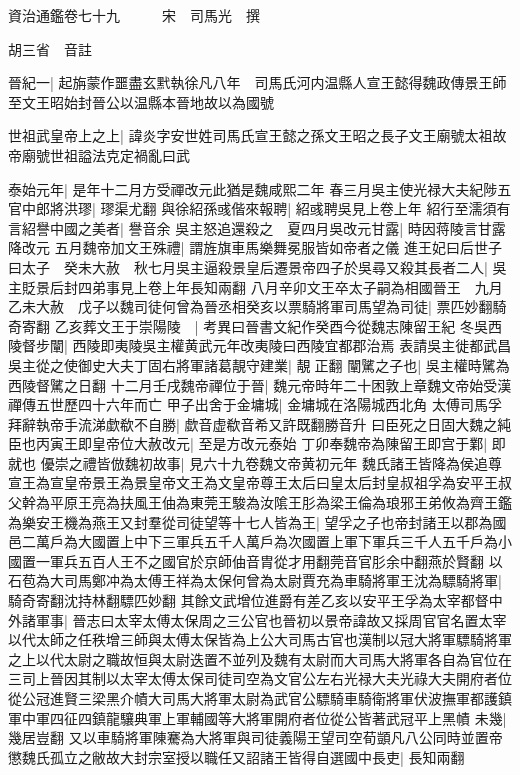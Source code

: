 資治通鑑卷七十九　　　宋　司馬光　撰

胡三省　音註

晉紀一|{
	起旃蒙作噩盡玄黓執徐凡八年　司馬氏河内温縣人宣王懿得魏政傳景王師至文王昭始封晉公以温縣本晉地故以為國號}


世祖武皇帝上之上|{
	諱炎字安世姓司馬氏宣王懿之孫文王昭之長子文王廟號太祖故帝廟號世祖謚法克定禍亂曰武}


泰始元年|{
	是年十二月方受禪改元此猶是魏咸熙二年}
春三月吳主使光禄大夫紀陟五官中郎將洪璆|{
	璆渠尤翻}
與徐紹孫彧偕來報聘|{
	紹彧聘吳見上卷上年}
紹行至濡須有言紹譽中國之美者|{
	譽音余}
吳主怒追還殺之　夏四月吳改元甘露|{
	時因蒋陵言甘露降改元}
五月魏帝加文王殊禮|{
	謂旌旗車馬樂舞冕服皆如帝者之儀}
進王妃曰后世子曰太子　癸未大赦　秋七月吳主逼殺景皇后遷景帝四子於吳尋又殺其長者二人|{
	吳主貶景后封四弟事見上卷上年長知兩翻}
八月辛卯文王卒太子嗣為相國晉王　九月乙未大赦　戊子以魏司徒何曾為晉丞相癸亥以票騎將軍司馬望為司徒|{
	票匹妙翻騎奇寄翻}
乙亥葬文王于崇陽陵　|{
	考異曰晉書文紀作癸酉今從魏志陳留王紀}
冬吳西陵督步闡|{
	西陵即夷陵吳主權黄武元年改夷陵曰西陵宜都郡治焉}
表請吳主徙都武昌吳主從之使御史大夫丁固右將軍諸葛靚守建業|{
	靚正翻}
闡騭之子也|{
	吳主權時騭為西陵督騭之日翻}
十二月壬戌魏帝禪位于晉|{
	魏元帝時年二十困敦上章魏文帝始受漢禪傳五世歷四十六年而亡}
甲子出舍于金墉城|{
	金墉城在洛陽城西北角}
太傅司馬孚拜辭執帝手流涕歔欷不自勝|{
	歔音虚欷音希又許既翻勝音升}
曰臣死之日固大魏之純臣也丙寅王即皇帝位大赦改元|{
	至是方改元泰始}
丁卯奉魏帝為陳留王即宫于鄴|{
	即就也}
優崇之禮皆倣魏初故事|{
	見六十九卷魏文帝黄初元年}
魏氏諸王皆降為侯追尊宣王為宣皇帝景王為景皇帝文王為文皇帝尊王太后曰皇太后封皇叔祖孚為安平王叔父幹為平原王亮為扶風王伷為東莞王駿為汝隂王肜為梁王倫為琅邪王弟攸為齊王鑑為樂安王機為燕王又封羣從司徒望等十七人皆為王|{
	望孚之子也帝封諸王以郡為國邑二萬戶為大國置上中下三軍兵五千人萬戶為次國置上軍下軍兵三千人五千戶為小國置一軍兵五百人王不之國官於京師伷音胄從才用翻莞音官肜余中翻燕於賢翻}
以石苞為大司馬鄭冲為太傅王祥為太保何曾為太尉賈充為車騎將軍王沈為驃騎將軍|{
	騎奇寄翻沈持林翻驃匹妙翻}
其餘文武增位進爵有差乙亥以安平王孚為太宰都督中外諸軍事|{
	晉志曰太宰太傅太保周之三公官也晉初以景帝諱故又採周官官名置太宰以代太師之任秩增三師與太傅太保皆為上公大司馬古官也漢制以冠大將軍驃騎將軍之上以代太尉之職故恒與太尉迭置不並列及魏有太尉而大司馬大將軍各自為官位在三司上晉因其制以太宰太傅太保司徒司空為文官公左右光禄大夫光祿大夫開府者位從公冠進賢三梁黑介幘大司馬大將軍太尉為武官公驃騎車騎衛將軍伏波撫軍都護鎮軍中軍四征四鎮龍驤典軍上軍輔國等大將軍開府者位從公皆著武冠平上黑幘}
未幾|{
	幾居豈翻}
又以車騎將軍陳騫為大將軍與司徒義陽王望司空荀顗凡八公同時並置帝懲魏氏孤立之敝故大封宗室授以職任又詔諸王皆得自選國中長吏|{
	長知兩翻}
